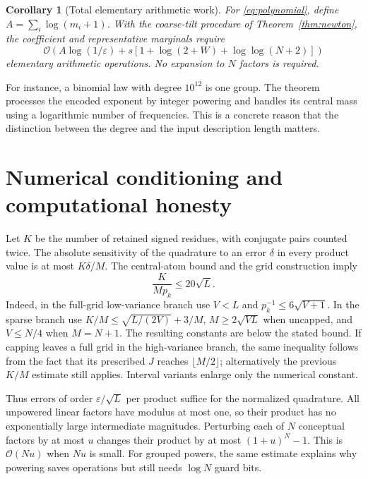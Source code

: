 \documentclass[11pt,a4paper]{article}
\newtheorem{corollary}[theorem]{Corollary}
\theoremstyle{definition}
\newcommand{\BigO}{\mathcal O}
\begin{document}
\begin{corollary}[Total elementary arithmetic work]\label{cor:totalcost}
For \eqref{eq:polynomial}, define $A=\sum_i\log(m_i+1)$. With the coarse-tilt procedure of Theorem~\ref{thm:newton}, the coefficient and representative marginals require
\[
 \BigO\!\left(
 A\log(1/\varepsilon)+s[1+\log(2+W)+\log\log(N+2)]\right)
\]
elementary arithmetic operations. No expansion to $N$ factors is required.
\end{corollary}

For instance, a binomial law with degree $10^{12}$ is one group. The theorem processes the encoded exponent by integer powering and handles its central mass using a logarithmic number of frequencies. This is a concrete reason that the distinction between the degree and the input description length matters.

\section{Numerical conditioning and computational honesty}\label{sec:numerics}

Let $K$ be the number of retained signed residues, with conjugate pairs counted twice. The absolute sensitivity of the quadrature to an error $\delta$ in every product value is at most $K\delta/M$. The central-atom bound and the grid construction imply
\begin{equation}\label{eq:conditioning}
 \frac{K}{Mp_k}\le20\sqrt L.
\end{equation}
Indeed, in the full-grid low-variance branch use $V<L$ and $p_k^{-1}\le6\sqrt{V+1}$. In the sparse branch use
$K/M\le\sqrt{L/(2V)}+3/M$, $M\ge2\sqrt{VL}$ when uncapped, and $V\le N/4$ when $M=N+1$. The resulting constants are below the stated bound. If capping leaves a full grid in the high-variance branch, the same inequality follows from the fact that its prescribed $J$ reaches $\lfloor M/2\rfloor$; alternatively the previous $K/M$ estimate still applies. Interval variants enlarge only the numerical constant.

Thus errors of order $\varepsilon/\sqrt L$ per product suffice for the normalized quadrature. All unpowered linear factors have modulus at most one, so their product has no exponentially large intermediate magnitudes. Perturbing each of $N$ conceptual factors by at most $u$ changes their product by at most $(1+u)^N-1$. This is $\BigO(Nu)$ when $Nu$ is small. For grouped powers, the same estimate explains why powering saves operations but still needs $\log N$ guard bits.
\end{document}
